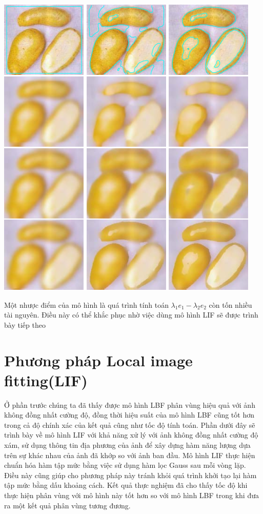 \documentclass[12pt,oneside,a4]{report}
\begin{document}
\begin{center}
\includegraphics[]{figure/denoise.png}
\end{center}

Một nhược điểm của mô hình là quá trình  tính toán $\lambda_1 e_1 -\lambda_2 e_2$ còn tốn nhiều tài nguyên. Điều này có thể khắc phục nhờ việc dùng mô hình LIF sẽ được trình bày tiếp theo
\section{Phương pháp Local image fitting(LIF)}
Ở phần trước chúng ta đã thấy được mô hình LBF phân vùng hiệu quả với ảnh không đồng nhất cường độ, đồng thời hiệu suất của mô hình LBF cũng tốt hơn trong cả độ chính xác của kết quả cũng như tốc độ tính toán. Phần dưới đây sẽ trình bày về mô hình LIF với khả năng xử lý với ảnh không đồng nhất cường độ xám, sử dụng thông tin địa phương của ảnh để xây dựng hàm năng lượng dựa trên sự khác nhau của ảnh đã khớp so với ảnh ban đầu. Mô hình LIF thực hiện chuẩn hóa hàm tập mức bằng việc sử dụng hàm lọc Gauss sau mỗi vòng lặp. Điều này cũng giúp cho phương pháp này tránh khỏi quá trình khởi tạo lại hàm tập mức bằng dấu khoảng cách. Kết quả thực nghiệm đã cho thấy tốc độ khi thực hiện phân vùng với mô hình này tốt hơn so với mô hình LBF trong khi đưa ra một kết quả phân vùng tương đương.
\end{document}
